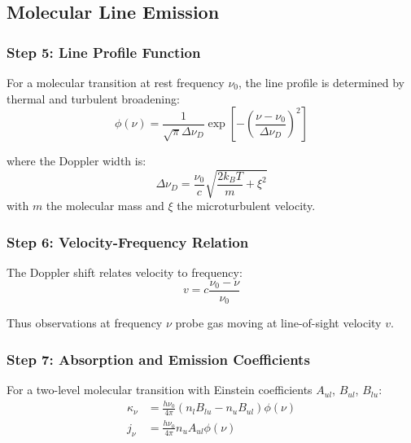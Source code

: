 \documentclass[twocolumn,amsmath,amssymb,prd,superscriptaddress,nofootinbib]{revtex4-2}
\begin{document}
\subsection{Molecular Line Emission}

\subsubsection{Step 5: Line Profile Function}

For a molecular transition at rest frequency $\nu_0$, the line profile is determined by thermal and turbulent broadening:
\begin{equation}
    \phi(\nu) = \frac{1}{\sqrt{\pi} \Delta\nu_D} \exp\left[-\left(\frac{\nu - \nu_0}{\Delta\nu_D}\right)^2\right]
    \label{eq:line_profile}
\end{equation}

where the Doppler width is:
\begin{equation}
    \Delta\nu_D = \frac{\nu_0}{c}\sqrt{\frac{2k_BT}{m} + \xi^2}
\end{equation}
with $m$ the molecular mass and $\xi$ the microturbulent velocity.

\subsubsection{Step 6: Velocity-Frequency Relation}

The Doppler shift relates velocity to frequency:
\begin{equation}
    \boxed{v = c\frac{\nu_0 - \nu}{\nu_0}}
    \label{eq:doppler}
\end{equation}

Thus observations at frequency $\nu$ probe gas moving at line-of-sight velocity $v$.

\subsubsection{Step 7: Absorption and Emission Coefficients}

For a two-level molecular transition with Einstein coefficients $A_{ul}$, $B_{ul}$, $B_{lu}$:
\begin{align}
    \kappa_\nu &= \frac{h\nu_0}{4\pi}(n_l B_{lu} - n_u B_{ul})\phi(\nu) \label{eq:kappa}\\
    j_\nu &= \frac{h\nu_0}{4\pi} n_u A_{ul} \phi(\nu) \label{eq:j}
\end{align}
\end{document}
